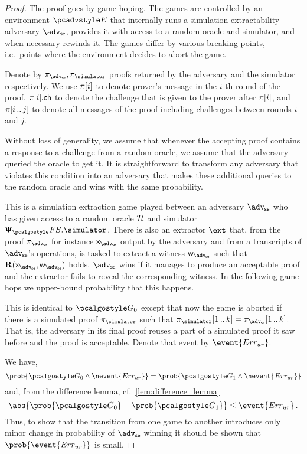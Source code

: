 \let\accentvec\vec \documentclass[runningheads,10pt]{llncs}
\begin{document}
\begin{proof}		
	The proof goes by game hoping. The games are controlled by an environment $\env$ that internally runs a simulation extractability adversary $\advse$,  provides it with access to a random oracle and simulator, and when necessary rewinds it.
	The games differ by various breaking points, i.e.~points where the environment decides to abort the game. 

	Denote by $\zkproof_{\advse}, \zkproof_{\simulator}$ proofs
	returned by the adversary and the simulator respectively. We use $\pi[i]$
	to denote prover's message in the $i$-th round of the proof, $\pi[i].\mathsf{ch}$
	to denote the challenge that is given to the prover after $\pi[i]$, and
	$\pi[i \, .. \, j]$ to denote all messages of the proof including challenges between rounds $i$ and $j$.
	
	Without loss of generality, we assume that whenever the accepting proof contains a response to a challenge from a random oracle, we assume that the adversary queried the oracle to get it. 
	It is straightforward to transform any adversary that violates this condition into an adversary that makes these additional queries to the random oracle and wins with the same probability.
	
	This is a simulation extraction game played between an adversary $\advse$ who has given access to a random oracle $\mathcal{H}$ and simulator $\psfs.\simulator$. 
	There is also an extractor $\ext$ that, from the proof $\zkproof_\advse$ for instance $\inp_\advse$ output by the adversary and from a transcripts of $\advse$'s operations, is tasked to extract a witness $\wit_\advse$ such that $\REL(\inp_\advse, \wit_\advse)$ holds.
	$\advse$ wins if it manages to produce an acceptable proof and the extractor fails to reveal the corresponding witness.
	In the following game hops we upper-bound probability that this happens.
	
	This is identical to $\game{0}$ except that now the game is aborted if there is a simulated proof $\zkproof_\simulator$ such that $\zkproof_\simulator\range{1}{k} = \zkproof_\advse\range{1}{k}$. That is, the adversary in its final proof reuses a part of a simulated proof it saw before and the proof is acceptable.
	Denote that event by $\event{\errur}$.
	
	We have, 
	\[
		\prob{\game{0} \land \nevent{\errur}} = \prob{\game{1} \land \nevent{\errur}}
	\]
	and, from the difference lemma, cf.~\cref{lem:difference_lemma}
	\[
		\abs{\prob{\game{0}} - \prob{\game{1}}} \leq \event{\errur}\,.
	\]
	Thus, to show that the transition from one game to another introduces only minor change in probability of $\advse$ winning it should be shown that $\prob{\event{\errur}}$ is small.
	

\end{proof}
\end{document}
